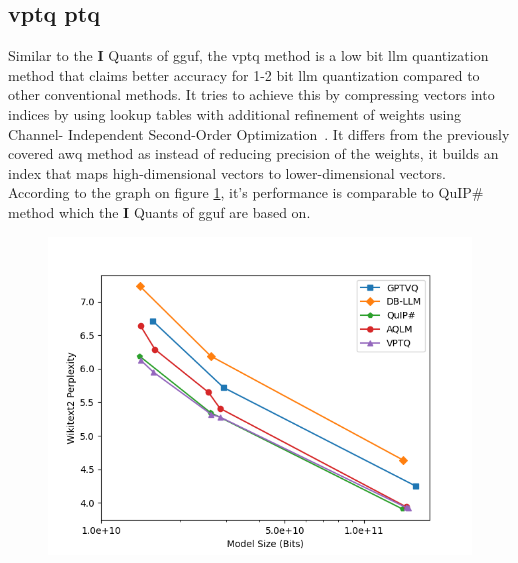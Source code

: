 \documentclass{ifacconf}
\begin{document}
	\subsection{\gls{vptq} \gls{ptq}}
	
	Similar to the \textbf{I} Quants of \gls{gguf}, the \gls{vptq} method is a low bit \gls{llm} quantization method that claims better accuracy for 1-2 bit \gls{llm} quantization compared to other conventional methods. It tries to achieve this by compressing vectors into indices by using lookup tables with additional refinement of weights using Channel-
	Independent Second-Order Optimization~\cite{liu2024vptqextremelowbitvector}. It differs from the previously covered \gls{awq} method as instead of reducing precision of the weights, it builds an index that maps high-dimensional vectors to lower-dimensional vectors. According to the graph on figure \ref{fig:vptq}, it's performance is comparable to QuIP\# method which the \textbf{I} Quants of \gls{gguf} are based on.
	
	\begin{figure}[h]
		\includegraphics[width=1.1\linewidth]{vptq}
		\label{fig:vptq}
	\end{figure}
	
\end{document}
